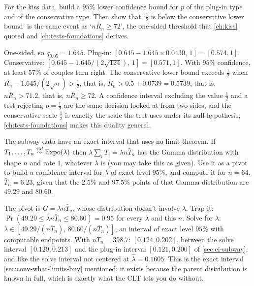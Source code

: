 \begin{exercise}
\label{ex:ci-onesided}
For the kiss data, build a $95\%$ lower confidence bound for $p$ of the plug-in type and of the conservative type. Then show that `$\frac12$ is below the conservative lower bound' is the same event as `$n\bar{R}_n \geq 72$', the one-sided threshold that \cref{ch:kiss} quoted and \cref{ch:tests-foundations} derives.
\end{exercise}
\begin{solution}
One-sided, so $q_{0.05} = 1.645$. Plug-in: $[0.645 - 1.645 \times 0.0430, \, 1] = [0.574, 1]$. Conservative: $[0.645 - 1.645/(2\sqrt{124}), \, 1] = [0.571, 1]$. With $95\%$ confidence, at least $57\%$ of couples turn right. The conservative lower bound exceeds $\frac12$ when $\bar{R}_n - 1.645/(2\sqrt{n}) > \frac12$, that is, $\bar{R}_n > 0.5 + 0.0739 = 0.5739$, that is, $n\bar{R}_n > 71.2$, that is, $n\bar{R}_n \geq 72$. A confidence interval excluding the value $\frac12$ and a test rejecting $p = \frac12$ are the same decision looked at from two sides, and the conservative scale $\frac12$ is exactly the scale the test uses under its null hypothesis; \cref{ch:tests-foundations} makes this duality general.
\end{solution}

\begin{exercise}
\label{ex:ci-gamma}
The subway data have an exact interval that uses no limit theorem. If $T_1, \ldots, T_n \stackrel{iid}{\sim} \text{Expo}(\lambda)$ then $\lambda \sum_i T_i = \lambda n \bar{T}_n$ has the Gamma distribution with shape $n$ and rate $1$, whatever $\lambda$ is (you may take this as given). Use it as a pivot to build a confidence interval for $\lambda$ of exact level $95\%$, and compute it for $n = 64$, $\bar{T}_n = 6.23$, given that the $2.5\%$ and $97.5\%$ points of that Gamma distribution are $49.29$ and $80.60$.
\end{exercise}
\begin{solution}
The pivot is $G = \lambda n \bar{T}_n$, whose distribution doesn't involve $\lambda$. Trap it: $\Pr(49.29 \leq \lambda n \bar{T}_n \leq 80.60) = 0.95$ for every $\lambda$ and this $n$. Solve for $\lambda$: $\lambda \in [49.29/(n\bar{T}_n), \, 80.60/(n\bar{T}_n)]$, an interval of exact level $95\%$ with computable endpoints. With $n\bar{T}_n = 398.7$: $[0.124, 0.202]$, between the solve interval $[0.129, 0.213]$ and the plug-in interval $[0.121, 0.200]$ of \cref{sec:ci-subway}, and like the solve interval not centered at $\hat{\lambda} = 0.1605$. This is the exact interval \cref{sec:conv-what-limits-buy} mentioned; it exists because the parent distribution is known in full, which is exactly what the CLT lets you do without.
\end{solution}
